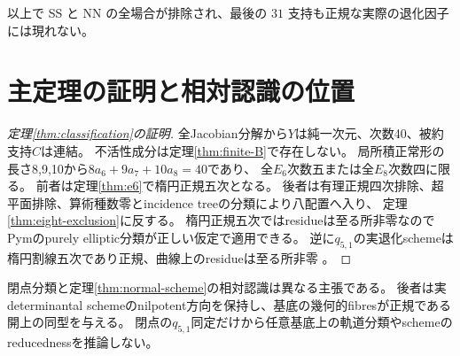 \documentclass[11pt,a4paper]{ltjsarticle}
\theoremstyle{remark}\newtheorem{remark}[theorem]{注意}
\begin{document}
以上で SS と NN の全場合が排除され、最後の $31$ 支持も正規な実際の退化因子には現れない。


\section{主定理の証明と相対認識の位置}
\begin{proof}[定理\ref{thm:classification}の証明]
全Jacobian分解から$Y$は純一次元、次数40、被約支持$C$は連結。
不活性成分は定理\ref{thm:finite-B}で存在しない。
局所積正常形の長さ8,9,10から$8a_6+9a_7+10a_8=40$であり、
全$E_6$次数五または全$E_8$次数四に限る。
前者は定理\ref{thm:e6}で楕円正規五次となる。
後者は有理正規四次排除、超平面排除、算術種数零とincidence treeの分類により八配置へ入り、
定理\ref{thm:eight-exclusion}に反する。
楕円正規五次ではresidueは至る所非零なのでPymのpurely elliptic分類が正しい仮定で適用できる。
逆に$q_{5,1}$の実退化schemeは楕円割線五次であり正規、曲線上のresidueは至る所非零
\cite[Theorems 8.1, 8.3 and Proposition 8.5]{GP}。
\end{proof}
閉点分類と定理\ref{thm:normal-scheme}の相対認識は異なる主張である。
後者は実determinantal schemeのnilpotent方向を保持し、基底の幾何的fibresが正規である開上の同型を与える。
閉点の$q_{5,1}$同定だけから任意基底上の軌道分類やschemeのreducednessを推論しない。
\appendix
\end{document}
